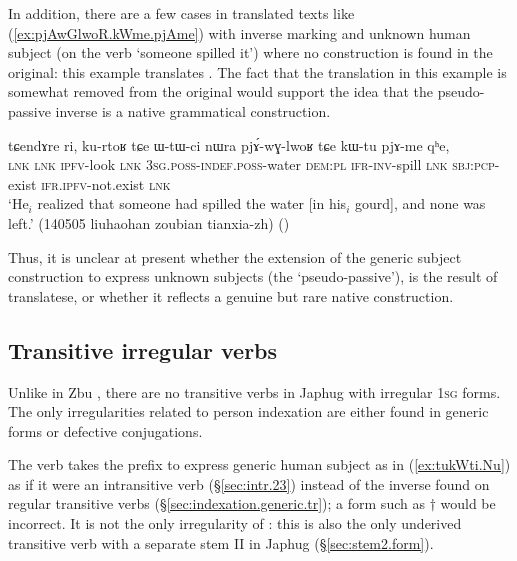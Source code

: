In addition, there are a few cases in translated texts like (\ref{ex:pjAwGlwoR.kWme.pjAme}) with inverse marking and unknown human subject (on the verb  `someone spilled it') where no   construction is found in the original: this example translates . The fact that the translation in this example is somewhat removed from the original would support the idea that the pseudo-passive inverse is a native grammatical construction.

\begin{exe}
\ex \label{ex:pjAwGlwoR.kWme.pjAme}
\gll  tɕendɤre ri, ku-rtoʁ tɕe ɯ-tɯ-ci nɯra pjɤ́-wɣ-lwoʁ tɕe kɯ-tu pjɤ-me qʰe,  \\
\textsc{lnk} \textsc{lnk} \textsc{ipfv}-look \textsc{lnk} \textsc{3sg}.\textsc{poss}-\textsc{indef}.\textsc{poss}-water \textsc{dem}:\textsc{pl} \textsc{ifr}-\textsc{inv}-spill \textsc{lnk} \textsc{sbj}:\textsc{pcp}-exist \textsc{ifr}.\textsc{ipfv}-not.exist \textsc{lnk} \\
\glt `He$_i$ realized that someone had spilled the water [in his$_i$ gourd], and none was left.' (140505 liuhaohan zoubian tianxia-zh)
()
\end{exe}

Thus, it is unclear at present whether the extension of the generic subject construction to express unknown subjects (the `pseudo-passive'), is the result of translatese, or whether it reflects a genuine but rare native construction.

\subsection{Transitive irregular verbs} \label{sec:irregular.transitive}
Unlike in Zbu \citep{gongxun14agreement}, there are no transitive verbs in Japhug with irregular \textsc{1sg} forms. The only irregularities related to person indexation are either found in generic forms or defective conjugations.

The verb  takes the prefix  to express generic human subject as in (\ref{ex:tukWti.Nu}) as if it were an intransitive verb (§\ref{sec:intr.23}) instead of the inverse  found on regular transitive verbs (§\ref{sec:indexation.generic.tr}); a form such as $\dagger$ would be incorrect. It is not the only irregularity of  : this is also the only underived transitive verb with a separate stem II in Japhug (§\ref{sec:stem2.form}).


